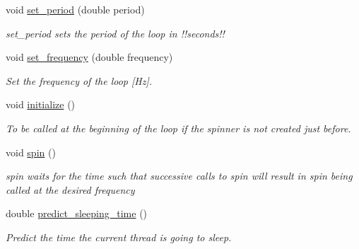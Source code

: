 \begin{DoxyCompactItemize}
\item 
void \hyperlink{classreal__time__tools_1_1Spinner_ac945d6df02f33e75f499922d23838408}{set\+\_\+period} (double period)
\begin{DoxyCompactList}\small\item\em set\+\_\+period sets the period of the loop in !!seconds!! \end{DoxyCompactList}\item 
void \hyperlink{classreal__time__tools_1_1Spinner_afa4e24e5dbbbfa2e0d694ef2e3fa3bb8}{set\+\_\+frequency} (double frequency)
\begin{DoxyCompactList}\small\item\em Set the frequency of the loop \mbox{[}Hz\mbox{]}. \end{DoxyCompactList}\item 
void \hyperlink{classreal__time__tools_1_1Spinner_aadeb66828ba2635858876491f1ffac11}{initialize} ()\hypertarget{classreal__time__tools_1_1Spinner_aadeb66828ba2635858876491f1ffac11}{}\label{classreal__time__tools_1_1Spinner_aadeb66828ba2635858876491f1ffac11}

\begin{DoxyCompactList}\small\item\em To be called at the beginning of the loop if the spinner is not created just before. \end{DoxyCompactList}\item 
void \hyperlink{classreal__time__tools_1_1Spinner_aa07d4fa32ead44008daa73663508139d}{spin} ()\hypertarget{classreal__time__tools_1_1Spinner_aa07d4fa32ead44008daa73663508139d}{}\label{classreal__time__tools_1_1Spinner_aa07d4fa32ead44008daa73663508139d}

\begin{DoxyCompactList}\small\item\em spin waits for the time such that successive calls to spin will result in spin being called at the desired frequency \end{DoxyCompactList}\item 
double \hyperlink{classreal__time__tools_1_1Spinner_a5a55ae6d3b5104b5f23e0f153851eb1d}{predict\+\_\+sleeping\+\_\+time} ()\hypertarget{classreal__time__tools_1_1Spinner_a5a55ae6d3b5104b5f23e0f153851eb1d}{}\label{classreal__time__tools_1_1Spinner_a5a55ae6d3b5104b5f23e0f153851eb1d}

\begin{DoxyCompactList}\small\item\em Predict the time the current thread is going to sleep. \end{DoxyCompactList}\end{DoxyCompactItemize}
